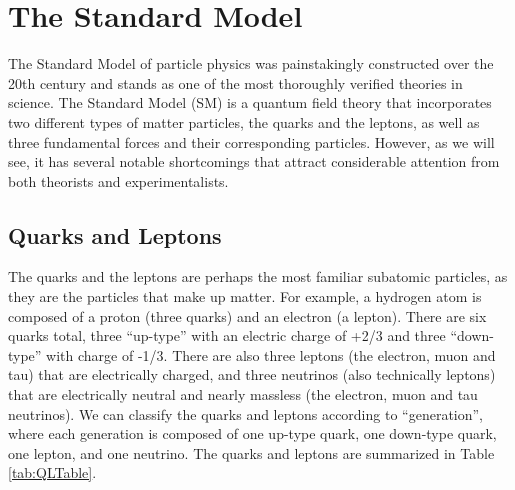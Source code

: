 \section{The Standard Model}
The Standard Model of particle physics was painstakingly constructed over the 20th century and stands 
as one of the most thoroughly verified theories in science.  The Standard Model 
(SM) is a quantum field theory that incorporates two different types of matter 
particles, the quarks and the leptons, as well as three fundamental forces and 
their corresponding particles.  However, as we will see, it has several notable 
shortcomings that attract considerable attention from both theorists and experimentalists.  

\subsection{Quarks and Leptons}
The quarks and the leptons are perhaps the most familiar subatomic particles, as they 
are the particles that make up matter.  For example, a hydrogen atom is 
composed of a proton (three quarks) and an electron (a lepton).  
There are six quarks total, three ``up-type'' with an electric 
charge of +2/3 and three ``down-type'' with charge 
of -1/3.  There are also three leptons 
(the electron, muon and tau) that are electrically charged, and three neutrinos (also technically leptons) 
that are electrically neutral and nearly massless (the electron, muon and tau neutrinos).  
We can classify the quarks and leptons according to ``generation'', where each generation 
is composed of one up-type quark, one down-type quark, 
one lepton, and one neutrino.  The quarks and leptons are summarized in Table \ref{tab:QLTable}.

